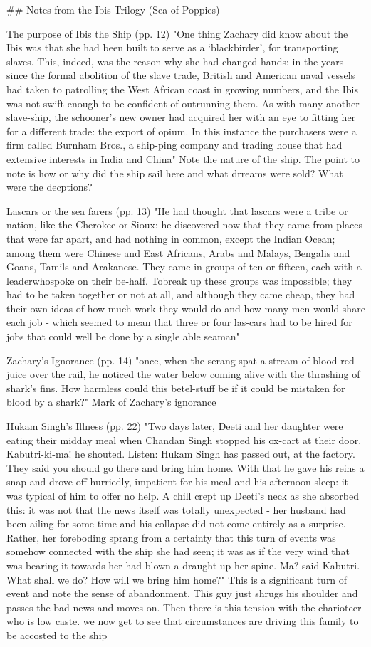 ## Notes from the Ibis Trilogy (Sea of Poppies)

The purpose of Ibis the Ship (pp. 12)
"One thing Zachary did know about the Ibis was that she had been built to serve as a ‘blackbirder’, for transporting slaves. This, indeed, was the reason why she had changed hands: in the years since the formal abolition of the slave trade, British and American naval vessels had taken to patrolling the West African coast in growing numbers, and the Ibis was not swift enough to be confident of outrunning them. As with many another slave-ship, the schooner’s new owner had acquired her with an eye to fitting her for a different trade: the export of opium. In this instance the purchasers were a firm called Burnham Bros., a ship-ping company and trading house that had extensive interests in India and China"
Note the nature of the ship. The point to note is how or why did the ship sail here and what drreams were sold? What were the decptions?

Lascars or the sea farers (pp. 13)
"He had thought that lascars were a tribe or nation, like the Cherokee or Sioux: he discovered now that they came from places that were far apart, and had nothing in common, except the Indian Ocean; among them were Chinese and East Africans, Arabs and Malays, Bengalis and Goans, Tamils and Arakanese. They came in groups of ten or fifteen, each with a leaderwhospoke on their be-half. Tobreak up these groups was impossible; they had to be taken together or not at all, and although they came cheap, they had their own ideas of how much work they would do and how many men would share each job - which seemed to mean that three or four las-cars had to be hired for jobs that could well be done by a single able seaman"

Zachary's Ignorance (pp. 14)
"once, when the serang spat a stream of blood-red juice over the rail, he noticed the water below coming alive with the thrashing of shark’s fins. How harmless could this betel-stuff be if it could be mistaken for blood by a shark?"
Mark of Zachary's ignorance

Hukam Singh's Illness (pp. 22)
"Two days later, Deeti and her daughter were eating their midday meal when Chandan Singh stopped his ox-cart at their door. Kabutri-ki-ma! he shouted. Listen: Hukam Singh has passed out, at the factory. They said you should go there and bring him home. With that he gave his reins a snap and drove off hurriedly, impatient for his meal and his afternoon sleep: it was typical of him to offer no help. A chill crept up Deeti’s neck as she absorbed this: it was not that the news itself was totally unexpected - her husband had been ailing for some time and his collapse did not come entirely as a surprise. Rather, her foreboding sprang from a certainty that this turn of events was somehow connected with the ship she had seen; it was as if the very wind that was bearing it towards her had blown a draught up her spine. Ma? said Kabutri. What shall we do? How will we bring him home?"
This is a significant turn of event and note the sense of abandonment. This guy just shrugs his shoulder and passes the bad news and moves on. Then there is this tension with the charioteer who is low caste. we now get to see that circumstances are driving this family to be accosted to the ship

